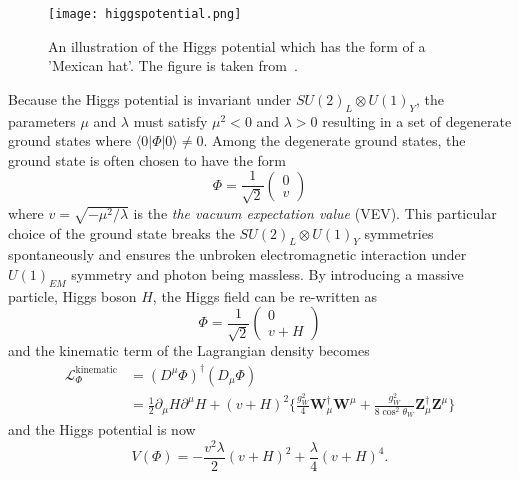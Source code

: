 \begin{figure}[htbp]
\begin{center}
\texttt{[image: higgspotential.png]}
\caption{An illustration of the Higgs potential which has the form of a ’Mexican hat’.
The figure is taken from~\cite{Ellis:2013jnq}.}
\label{fig:sm_higgs_potential}
\end{center}
\end{figure}

Because the Higgs potential is invariant under $SU(2)_{L} \otimes U(1)_{Y}$, the parameters $\mu$ and $\lambda$ must satisfy $\mu^{2} < 0$ and $\lambda > 0$ resulting in a set of degenerate ground states where $\langle 0|\Phi|0 \rangle \neq 0$.
Among the degenerate ground states, the ground state is often chosen to have the form
%
\begin{equation}
\Phi = \frac{1}{\sqrt{2}}\left(\begin{matrix}0\\v\end{matrix}\right)
\label{eq:sm_ground_state}
\end{equation}
%
where $v = \sqrt{-\mu^{2}/\lambda}$ is the \textit{the vacuum expectation value} (VEV).
This particular choice of the ground state breaks the $SU(2)_{L} \otimes U(1)_{Y}$ symmetries spontaneously and  ensures the unbroken electromagnetic interaction under $U(1)_{EM}$ symmetry and photon being massless.
By introducing a massive particle, Higgs boson $H$, the Higgs field can be re-written as
%
\begin{equation}
\Phi = \frac{1}{\sqrt{2}}\left(\begin{matrix}0\\v + H\end{matrix}\right)
\label{eq:sm_ground_state_2}
\end{equation}
%
and the kinematic term of the Lagrangian density becomes
%
\begin{align}
\mathcal{L}_{\Phi}^{\textrm{kinematic}} & = (D^{\mu}\Phi)^{\dagger}(D_{\mu}\Phi)\\
& = \frac{1}{2}\partial_{\mu}H\partial^{\mu}H + (v + H)^{2}\Big\{\frac{g_{W}^{2}}{4} \bm{W}_{\mu}^{\dagger}\bm{W}^{\mu} + \frac{g_{W}^{2}}{8\cos^{2}\theta_{W}}\bm{Z}_{\mu}^{\dagger}\bm{Z}^{\mu}\Big\}
\label{eq:sm_Lagrangian_kinematic_term}
\end{align}
%
and the Higgs potential is now
%
\begin{equation}
V(\Phi) = -\frac{v^{2} \lambda}{2}(v+H)^{2} + \frac{\lambda}{4}(v+H)^{4}.
\end{equation}
